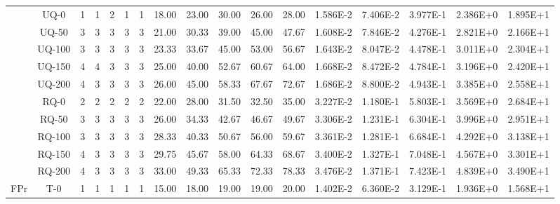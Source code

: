 \begin{table}[ht]
\begin{center}
{\begin{tabular}{cc|c|c|c|c|c|c|c|c|c|c|c|c|c|c|c|}
\cline{2-17}																														
\multicolumn{1}{|c|}{}                      & \multicolumn{1}{|c|}{UQ-0} &	1	&	1	&	2	&	1	&	1	&	18.00	&	23.00	&	30.00	&	26.00	&	28.00	&	1.586E-2	&	7.406E-2	&	3.977E-1	&	2.386E+0	&	1.895E+1	\\
\multicolumn{1}{|c|}{}                      & \multicolumn{1}{|c|}{UQ-50} &	3	&	3	&	3	&	3	&	3	&	21.00	&	30.33	&	39.00	&	45.00	&	47.67	&	1.608E-2	&	7.846E-2	&	4.276E-1	&	2.821E+0	&	2.166E+1	\\
\multicolumn{1}{|c|}{}                      & \multicolumn{1}{|c|}{UQ-100} &	3	&	3	&	3	&	3	&	3	&	23.33	&	33.67	&	45.00	&	53.00	&	56.67	&	1.643E-2	&	8.047E-2	&	4.478E-1	&	3.011E+0	&	2.304E+1	\\
\multicolumn{1}{|c|}{}                      & \multicolumn{1}{|c|}{UQ-150} &	4	&	4	&	3	&	3	&	3	&	25.00	&	40.00	&	52.67	&	60.67	&	64.00	&	1.668E-2	&	8.472E-2	&	4.784E-1	&	3.196E+0	&	2.420E+1	\\
\multicolumn{1}{|c|}{}                      & \multicolumn{1}{|c|}{UQ-200} &	4	&	3	&	3	&	3	&	3	&	26.00	&	45.00	&	58.33	&	67.67	&	72.67	&	1.686E-2	&	8.800E-2	&	4.943E-1	&	3.385E+0	&	2.558E+1	\\
\cline{2-17}																														
\multicolumn{1}{|c|}{}                      & \multicolumn{1}{|c|}{RQ-0} &	2	&	2	&	2	&	2	&	2	&	22.00	&	28.00	&	31.50	&	32.50	&	35.00	&	3.227E-2	&	1.180E-1	&	5.803E-1	&	3.569E+0	&	2.684E+1	\\
\multicolumn{1}{|c|}{}                      & \multicolumn{1}{|c|}{RQ-50} & 	3	&	3	&	3	&	3	&	3	&	26.00	&	34.33	&	42.67	&	46.67	&	49.67	&	3.306E-2	&	1.231E-1	&	6.304E-1	&	3.996E+0	&	2.951E+1	\\
\multicolumn{1}{|c|}{}                      & \multicolumn{1}{|c|}{RQ-100} &	3	&	3	&	3	&	3	&	3	&	28.33	&	40.33	&	50.67	&	56.00	&	59.67	&	3.361E-2	&	1.281E-1	&	6.684E-1	&	4.292E+0	&	3.138E+1	\\
\multicolumn{1}{|c|}{}                      & \multicolumn{1}{|c|}{RQ-150} &	4	&	3	&	3	&	3	&	3	&	29.75	&	45.67	&	58.00	&	64.33	&	68.67	&	3.400E-2	&	1.327E-1	&	7.048E-1	&	4.567E+0	&	3.301E+1	\\
\multicolumn{1}{|c|}{}                      & \multicolumn{1}{|c|}{RQ-200} & 	4	&	3	&	3	&	3	&	3	&	33.00	&	49.33	&	65.33	&	72.33	&	78.33	&	3.476E-2	&	1.371E-1	&	7.423E-1	&	4.839E+0	&	3.490E+1	\\
\cline{1-17}																														
\multicolumn{1}{|c|}{\multirow{15}{*}{FPr}} & \multicolumn{1}{|c|}{T-0} & 	1	&	1	&	1	&	1	&	1	&	15.00	&	18.00	&	19.00	&	19.00	&	20.00	&	1.402E-2	&	6.360E-2	&	3.129E-1	&	1.936E+0	&	1.568E+1	\\

\end{tabular}}
\end{center}
\end{table}
